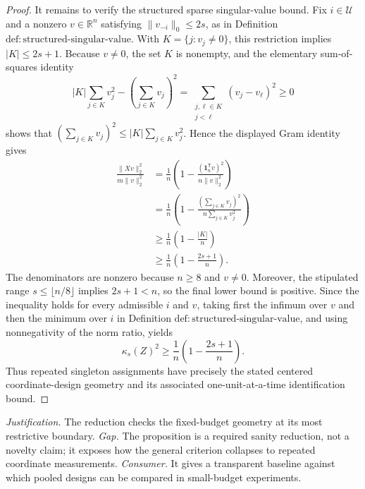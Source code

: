 \documentclass{article}
\begin{document}
\begin{proof}
It remains to verify the structured sparse singular-value bound.  Fix \(i\in\mathcal U\) and a nonzero \(v\in\mathbb R^n\) satisfying \(\lVert v_{-i}\rVert_0\le 2s\), as in Definition \(\mathrm{def{:}structured\mbox{-}singular\mbox{-}value}\).  With \(K=\{j:v_j\ne0\}\), this restriction implies \(\lvert K\rvert\le 2s+1\).  Because \(v\ne0\), the set \(K\) is nonempty, and the elementary sum-of-squares identity
\[
\lvert K\rvert\sum_{j\in K}v_j^2-\left(\sum_{j\in K}v_j\right)^2
=\sum_{\substack{j,\ell\in K\\j<\ell}}(v_j-v_\ell)^2
\ge0
\]
shows that \(\left(\sum_{j\in K}v_j\right)^2\le\lvert K\rvert\sum_{j\in K}v_j^2\).  Hence the displayed Gram identity gives
\[
\begin{aligned}
\frac{\lVert Xv\rVert_2^2}{m\lVert v\rVert_2^2}
&=\frac{1}{n}\left(1-\frac{(\mathbf 1_n^{\mathsf T}v)^2}{n\lVert v\rVert_2^2}\right)\\
&=\frac{1}{n}\left(1-\frac{\left(\sum_{j\in K}v_j\right)^2}{n\sum_{j\in K}v_j^2}\right)\\
&\ge \frac{1}{n}\left(1-\frac{\lvert K\rvert}{n}\right)\\
&\ge \frac{1}{n}\left(1-\frac{2s+1}{n}\right).
\end{aligned}
\]
The denominators are nonzero because \(n\ge8\) and \(v\ne0\).  Moreover, the stipulated range \(s\le\lfloor n/8\rfloor\) implies \(2s+1<n\), so the final lower bound is positive.  Since the inequality holds for every admissible \(i\) and \(v\), taking first the infimum over \(v\) and then the minimum over \(i\) in Definition \(\mathrm{def{:}structured\mbox{-}singular\mbox{-}value}\), and using nonnegativity of the norm ratio, yields
\[
\kappa_s(Z)^2\ge \frac{1}{n}\left(1-\frac{2s+1}{n}\right).
\]
Thus repeated singleton assignments have precisely the stated centered coordinate-design geometry and its associated one-unit-at-a-time identification bound.
\end{proof}
\par\smallskip\noindent \textit{Justification.} The reduction checks the fixed-budget geometry at its most restrictive boundary. \textit{Gap.} The proposition is a required sanity reduction, not a novelty claim; it exposes how the general criterion collapses to repeated coordinate measurements. \textit{Consumer.} It gives a transparent baseline against which pooled designs can be compared in small-budget experiments.
\end{document}
